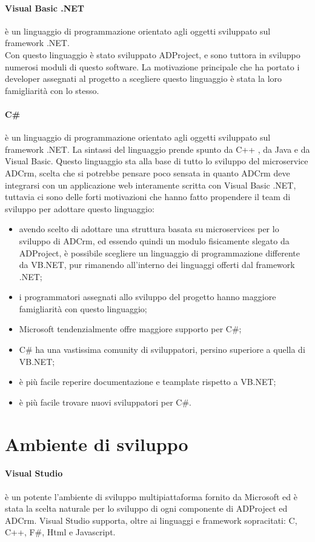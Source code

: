\documentclass[12pt,a4paper,twoside,openright,english]{book}
\begin{document}
\paragraph{Visual Basic .NET}
è un linguaggio di programmazione orientato agli oggetti sviluppato sul framework .NET.\\
Con questo linguaggio è stato sviluppato ADProject, e sono tuttora in sviluppo numerosi moduli di questo software. La motivazione principale che ha portato i developer assegnati al progetto a scegliere questo linguaggio è stata la loro famigliarità con lo stesso. 

\paragraph{C\#}
è un linguaggio di programmazione orientato agli oggetti sviluppato sul framework .NET.
La sintassi del linguaggio prende spunto da C++ , da Java
e da Visual Basic.
Questo linguaggio sta alla base di tutto lo sviluppo del microservice ADCrm, scelta che si potrebbe pensare poco sensata in quanto ADCrm deve integrarsi con un applicazione web interamente scritta con Visual Basic .NET, tuttavia ci sono delle forti motivazioni che hanno fatto propendere il team di sviluppo per adottare questo linguaggio:
\begin{itemize}
	\item avendo scelto di adottare una struttura basata su microservices per lo sviluppo di ADCrm, ed essendo quindi un modulo fisicamente slegato da ADProject, è possibile scegliere un linguaggio di programmazione differente da VB.NET, pur rimanendo all'interno dei linguaggi offerti dal framework .NET;
	\item i programmatori assegnati allo sviluppo del progetto hanno maggiore famigliarità con questo linguaggio;
	\item Microsoft tendenzialmente offre maggiore supporto per C\#;
	\item C\# ha una vastissima comunity di sviluppatori, persino superiore a quella di VB.NET;
	\item è più facile reperire documentazione e teamplate rispetto a VB.NET;
	\item è più facile trovare nuovi sviluppatori per C\#.	
\end{itemize}

\section{Ambiente di sviluppo}
\paragraph{Visual Studio}
 è un potente l'ambiente di sviluppo multipiattaforma fornito da Microsoft ed è stata la scelta naturale per lo sviluppo di ogni componente di ADProject ed ADCrm.
Visual Studio supporta, oltre ai linguaggi e framework sopracitati: C, C++, F\#, Html e Javascript. 
\end{document}
